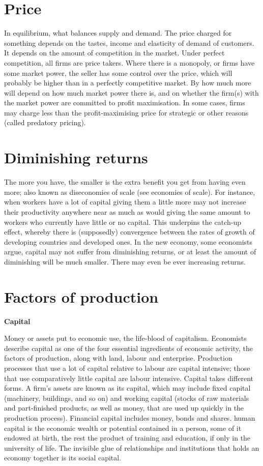 \documentclass[11pt,]{book}
\theoremstyle{definition}
\theoremstyle{definition}
\theoremstyle{definition}
\theoremstyle{remark}
\begin{document}
\section{Price}\label{price}

In equilibrium, what balances supply and demand. The price charged for
something depends on the tastes, income and elasticity of demand of
customers. It depends on the amount of competition in the market. Under
perfect competition, all firms are price takers. Where there is a
monopoly, or firms have some market power, the seller has some control
over the price, which will probably be higher than in a perfectly
competitive market. By how much more will depend on how much market
power there is, and on whether the firm(s) with the market power are
committed to profit maximisation. In some cases, firms may charge less
than the profit-maximising price for strategic or other reasons (called
predatory pricing).

\section{Diminishing returns}\label{diminishing-returns}

The more you have, the smaller is the extra benefit you get from having
even more; also known as diseconomies of scale (see economies of scale).
For instance, when workers have a lot of capital giving them a little
more may not increase their productivity anywhere near as much as would
giving the same amount to workers who currently have little or no
capital. This underpins the catch-up effect, whereby there is
(supposedly) convergence between the rates of growth of developing
countries and developed ones. In the new economy, some economists argue,
capital may not suffer from diminishing returns, or at least the amount
of diminishing will be much smaller. There may even be ever increasing
returns.

\section{Factors of production}\label{factors-of-production}

\textbf{Capital}

Money or assets put to economic use, the life-blood of capitalism.
Economists describe capital as one of the four essential ingredients of
economic activity, the factors of production, along with land, labour
and enterprise. Production processes that use a lot of capital relative
to labour are capital intensive; those that use comparatively little
capital are labour intensive. Capital takes different forms. A firm's
assets are known as its capital, which may include fixed capital
(machinery, buildings, and so on) and working capital (stocks of raw
materials and part-finished products, as well as money, that are used up
quickly in the production process). Financial capital includes money,
bonds and shares. human capital is the economic wealth or potential
contained in a person, some of it endowed at birth, the rest the product
of training and education, if only in the university of life. The
invisible glue of relationships and institutions that holds an economy
together is its social capital.
\end{document}
